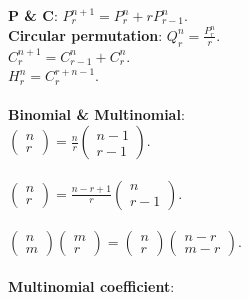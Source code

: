 \documentclass[9pt]{article}
\begin{document}
    \begin{multicols*}{2}
        \textbf{P \& C}: $P^{n + 1}_r = P^n_r + rP^n_{r - 1}$.
        \\
        \textbf{Circular permutation}: $Q^n_r = \frac{P^n_r}{r}$.
        \\
        $C^{n + 1}_r = C^n_{r - 1} + C^n_r$.
        \\
        $H^n_r = C^{r + n - 1}_r$.
        \\\\
        \textbf{Binomial \& Multinomial}:
        \\
        $\begin{pmatrix}
            n \\
            r
        \end{pmatrix} = \frac{n}{r}\begin{pmatrix}
            n - 1 \\
            r - 1
        \end{pmatrix}$.
        \\\\
        $\begin{pmatrix}
            n \\
            r
        \end{pmatrix} = \frac{n - r + 1}{r}\begin{pmatrix}
            n \\
            r - 1
        \end{pmatrix}$.
        \\\\
        $\begin{pmatrix}
            n \\
            m
        \end{pmatrix}\begin{pmatrix}
            m \\
            r
        \end{pmatrix} = \begin{pmatrix}
            n \\
            r
        \end{pmatrix}\begin{pmatrix}
            n - r \\
            m - r
        \end{pmatrix}$.
        \\\\
        \textbf{Multinomial coefficient}:
        \begin{equation*}

\end{equation*}
\end{multicols*}
\end{document}
